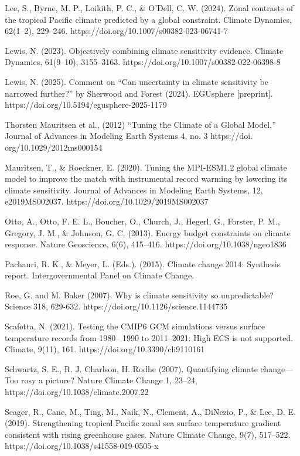 \documentclass[12pt,paper=a4,DIV=12,parskip=never,chapterprefix=false,headings=standardclasses]{scrreprt}
\begin{document}
Lee, S., Byrne, M. P., Loikith, P. C., \& O’Dell, C. W. (2024). Zonal contrasts of the tropical Pacific
climate predicted by a global constraint. Climate Dynamics, 62(1–2), 229–246.
https://doi.org/10.1007/s00382-023-06741-7

Lewis, N. (2023). Objectively combining climate sensitivity evidence. Climate Dynamics, 61(9–10),
3155–3163. https://doi.org/10.1007/s00382-022-06398-8

Lewis, N. (2025). Comment on “Can uncertainty in climate sensitivity be narrowed further?” by
Sherwood and Forest (2024). EGUsphere [preprint]. https://doi.org/10.5194/egusphere-2025-1179

Thorsten Mauritsen et al., (2012) “Tuning the Climate of a Global Model,” Journal of Advances in
Modeling Earth Systems 4, no. 3 https://doi. org/10.1029/2012ms000154


Mauritsen, T., \& Roeckner, E. (2020). Tuning the MPI-ESM1.2 global climate model to improve the
match with instrumental record warming by lowering its climate sensitivity. Journal of Advances in
Modeling Earth Systems, 12, e2019MS002037. https://doi.org/10.1029/2019MS002037

Otto, A., Otto, F. E. L., Boucher, O., Church, J., Hegerl, G., Forster, P. M., Gregory, J. M., \& Johnson, G.
C. (2013). Energy budget constraints on climate response. Nature Geoscience, 6(6), 415–416.
https://doi.org/10.1038/ngeo1836

Pachauri, R. K., \& Meyer, L. (Eds.). (2015). Climate change 2014: Synthesis report. Intergovernmental
Panel on Climate Change.

Roe, G. and M. Baker (2007). Why is climate sensitivity so unpredictable? Science 318, 629-632.
https://doi.org/10.1126/science.1144735

Scafetta, N. (2021). Testing the CMIP6 GCM simulations versus surface temperature records from 1980–
1990 to 2011–2021: High ECS is not supported. Climate, 9(11), 161.
https://doi.org/10.3390/cli9110161

Schwartz, S. E., R. J. Charlson, H. Rodhe (2007). Quantifying climate change—Too rosy a picture?
Nature Climate Change 1, 23–24, https://doi.org/10.1038/climate.2007.22

Seager, R., Cane, M., Ting, M., Naik, N., Clement, A., DiNezio, P., \& Lee, D. E. (2019). Strengthening
tropical Pacific zonal sea surface temperature gradient consistent with rising greenhouse gases.
Nature Climate Change, 9(7), 517–522. https://doi.org/10.1038/s41558-019-0505-x
\end{document}
